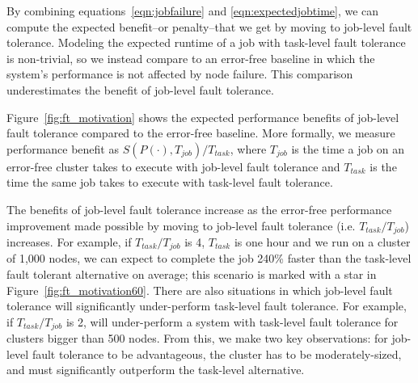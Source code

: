 By combining equations~\ref{eqn:jobfailure} and \ref{eqn:expectedjobtime}, we
can compute the expected benefit--or penalty--that we get by moving to
job-level fault tolerance.  Modeling the expected runtime of a job with
task-level fault tolerance is non-trivial, so we instead compare to an
error-free baseline in which the system's performance is not affected by node
failure.  This comparison underestimates the benefit of job-level fault
tolerance.

Figure~\ref{fig:ft_motivation} shows the expected performance benefits of
job-level fault tolerance compared to the error-free baseline.  More formally,
we measure performance benefit as $S(P(\cdot),T_{job}) / T_{task}$,
where $T_{job}$ is the time a job on an error-free cluster takes to execute
with job-level fault tolerance and $T_{task}$ is the time the same job takes to
execute with task-level fault tolerance.

The benefits of job-level fault tolerance increase as the error-free
performance improvement made possible by moving to job-level fault tolerance
(i.e. $T_{task} / T_{job}$) increases. For example, if $T_{task} / T_{job}$ is
4, $T_{task}$ is one hour and we run on a cluster of 1,000 nodes, we can expect
\themis to complete the job 240\% faster than the task-level fault tolerant
alternative on average; this scenario is marked with a star in
Figure~\ref{fig:ft_motivation60}.  There are also situations in which
job-level fault tolerance will significantly under-perform task-level fault
tolerance.  For example, if $T_{task} / T_{job}$ is 2, \themis will
under-perform a system with task-level fault tolerance for clusters bigger than
500 nodes.  From this, we make two key observations: for job-level fault
tolerance to be advantageous, the cluster has to be moderately-sized, and
\themis must significantly outperform the task-level alternative.
